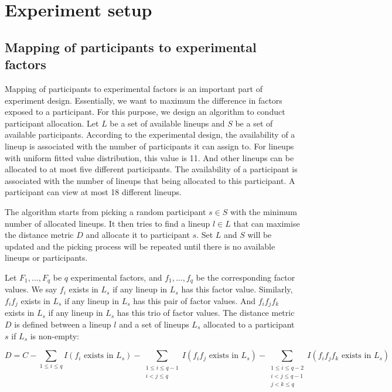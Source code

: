 \documentclass[]{interact}
\theoremstyle{plain}%
\theoremstyle{definition}
\theoremstyle{remark}
\begin{document}
\hypertarget{experiment-setup}{%
\section{Experiment setup}\label{experiment-setup}}

\hypertarget{mapping-of-participants-to-experimental-factors}{%
\subsection{Mapping of participants to experimental
factors}\label{mapping-of-participants-to-experimental-factors}}

Mapping of participants to experimental factors is an important part of
experiment design. Essentially, we want to maximum the difference in
factors exposed to a participant. For this purpose, we design an
algorithm to conduct participant allocation. Let \(L\) be a set of
available lineups and \(S\) be a set of available participants.
According to the experimental design, the availability of a lineup is
associated with the number of participants it can assign to. For lineups
with uniform fitted value distribution, this value is 11. And other
lineups can be allocated to at most five different participants. The
availability of a participant is associated with the number of lineups
that being allocated to this participant. A participant can view at most
18 different lineups.

The algorithm starts from picking a random participant \(s \in S\) with
the minimum number of allocated lineups. It then tries to find a lineup
\(l \in L\) that can maximise the distance metric \(D\) and allocate it
to participant \(s\). Set \(L\) and \(S\) will be updated and the
picking process will be repeated until there is no available lineups or
participants.

Let \(F_1,...,F_q\) be \(q\) experimental factors, and \(f_1, ...,f_q\)
be the corresponding factor values. We say \(f_i\) exists in \(L_{s}\)
if any lineup in \(L_{s}\) has this factor value. Similarly, \(f_if_j\)
exists in \(L_{s}\) if any lineup in \(L_{s}\) has this pair of factor
values. And \(f_if_jf_k\) exists in \(L_{s}\) if any lineup in \(L_{s}\)
has this trio of factor values. The distance metric \(D\) is defined
between a lineup \(l\) and a set of lineups \(L_{s}\) allocated to a
participant \(s\) if \(L_{s}\) is non-empty:

\footnotesize

\begin{equation*}
D =
C - \sum_{1\leq i \leq q}I(f_i\text{ exists in }L_{s}) - \sum_{\substack{1\leq i \leq q-1 \\ i < j \leq q}}I(f_if_j\text{ exists in }L_{s}) - \sum_{\substack{1\leq i \leq q - 2 \\ i < j \leq q - 1 \\ j < k \leq q}}I(f_if_jf_k\text{ exists in }L_{s})
\end{equation*}
\end{document}
